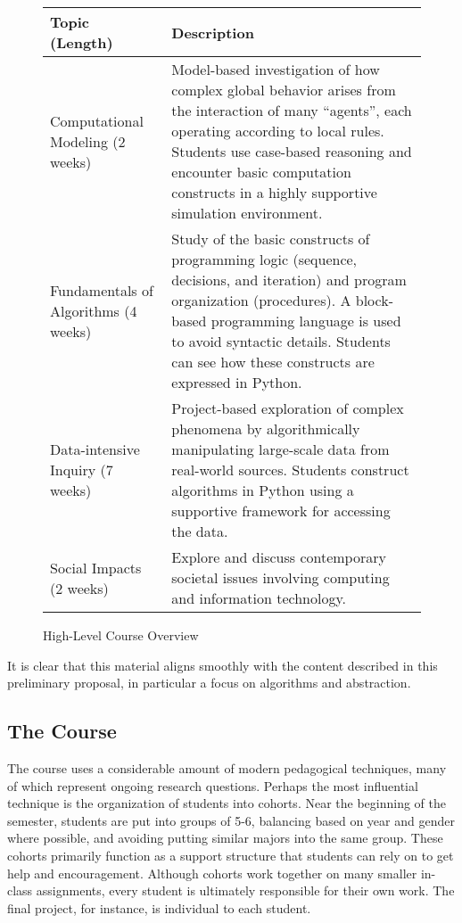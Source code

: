 \begin{figure*}
\begin{tabularx}{\textwidth}{ |l|X| }
\hline
Topic (Length) &	Description \\\hline
Computational Modeling \newline\newline
 (2 weeks) & Model-based investigation of how complex global behavior arises from the interaction of many “agents”, each operating according to local rules. Students use case-based reasoning and encounter basic computation constructs in a highly supportive simulation environment. \\\hline
Fundamentals of Algorithms \newline (4 weeks) & Study of the basic constructs of programming logic (sequence, decisions, and iteration) and program organization (procedures). A block-based programming language is used to avoid syntactic details. Students can see how these constructs are expressed in Python. \\\hline
Data-intensive Inquiry \newline (7 weeks) & Project-based exploration of complex phenomena by algorithmically manipulating large-scale data from real-world sources. Students construct algorithms in Python using a supportive framework for accessing the data. \\\hline
Social Impacts \newline (2 weeks) & Explore and discuss contemporary societal issues involving computing and information technology. \\\hline
\end{tabularx}
\caption{High-Level Course Overview}
\label{course-outline}
\end{figure*}

It is clear that this material aligns smoothly with the content described in this preliminary proposal, in particular a focus on algorithms and abstraction.

\subsection{The Course}

The course uses a considerable amount of modern pedagogical techniques, many of which represent ongoing research questions.
Perhaps the most influential technique is the organization of students into cohorts.
Near the beginning of the semester, students are put into groups of 5-6, balancing based on year and gender where possible, and avoiding putting similar majors into the same group.
These cohorts primarily function as a support structure that students can rely on to get help and encouragement.
Although cohorts work together on many smaller in-class assignments, every student is ultimately responsible for their own work. The final project, for instance, is individual to each student.

